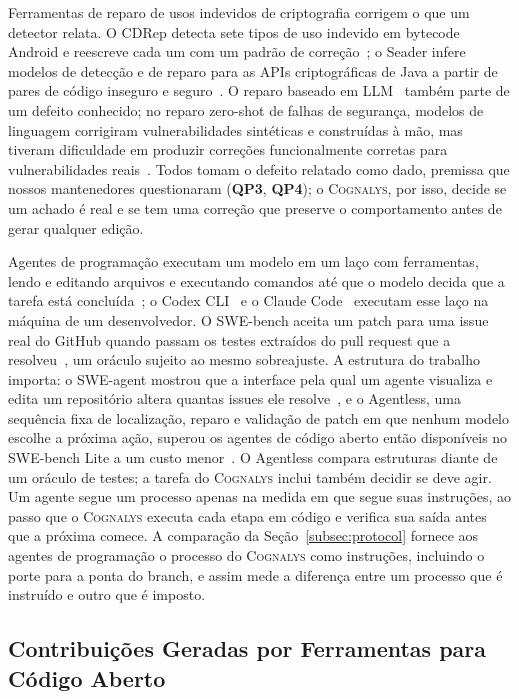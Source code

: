 \documentclass[conference]{IEEEtran}
\newcommand{\system}{\textsc{Cognalys}}
\newcommand{\researchq}[1]{\textbf{QP#1}}
\begin{document}
Ferramentas de reparo de usos indevidos de criptografia corrigem o que um
detector relata. O CDRep detecta sete tipos de uso indevido em bytecode Android
e reescreve cada um com um padrão de correção~\cite{ma2016cdrep}; o Seader
infere modelos de detecção e de reparo para as APIs criptográficas de Java a
partir de pares de código inseguro e seguro~\cite{zhang2022seader}. O reparo
baseado em LLM~\cite{xia2023apr,zhang2023apimisuse} também parte de um defeito
conhecido; no reparo zero-shot de falhas de segurança, modelos de linguagem
corrigiram vulnerabilidades sintéticas e construídas à mão, mas tiveram
dificuldade em produzir correções funcionalmente corretas para vulnerabilidades
reais~\cite{pearce2023zeroshot}. Todos tomam o defeito relatado como dado,
premissa que nossos mantenedores questionaram (\researchq{3}, \researchq{4}); o
\system{}, por isso, decide se um achado é real e se tem uma correção que
preserve o comportamento antes de gerar qualquer edição.

Agentes de programação executam um modelo em um laço com ferramentas, lendo e
editando arquivos e executando comandos até que o modelo decida que a tarefa
está concluída~\cite{yang2024sweagent}; o Codex CLI~\cite{openai2026codex} e o
Claude Code~\cite{anthropic2026claudecode} executam esse laço na máquina de um
desenvolvedor. O SWE-bench aceita um patch para uma issue real do GitHub quando
passam os testes extraídos do pull request que a resolveu~\cite{jimenez2024swebench},
um oráculo sujeito ao mesmo sobreajuste. A estrutura do trabalho importa: o
SWE-agent mostrou que a interface pela qual um agente visualiza e edita um
repositório altera quantas issues ele resolve~\cite{yang2024sweagent}, e o
Agentless, uma sequência fixa de localização, reparo e validação de patch em que
nenhum modelo escolhe a próxima ação, superou os agentes de código aberto então
disponíveis no SWE-bench Lite a um custo menor~\cite{xia2025agentless}. O
Agentless compara estruturas diante de um oráculo de testes; a tarefa do
\system{} inclui também decidir se deve agir. Um agente segue um processo apenas
na medida em que segue suas instruções, ao passo que o \system{} executa cada
etapa em código e verifica sua saída antes que a próxima comece. A comparação da
Seção~\ref{subsec:protocol} fornece aos agentes de programação o processo do
\system{} como instruções, incluindo o porte para a ponta do branch, e
assim mede a diferença entre um processo que é instruído e outro que é imposto.

\subsection{Contribuições Geradas por Ferramentas para Código Aberto}
\label{subsec:bots}
\end{document}
